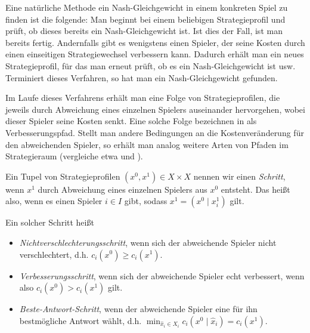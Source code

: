 Eine natürliche Methode ein Nash-Gleichgewicht in einem konkreten Spiel zu finden ist die folgende: Man beginnt bei einem beliebigen Strategieprofil und prüft, ob dieses bereits ein Nash-Gleichgewicht ist. Ist dies der Fall, ist man bereits fertig. Andernfalls gibt es wenigstens einen Spieler, der seine Kosten durch einen einseitigen Strategiewechsel verbessern kann. Dadurch erhält man ein neues Strategieprofil, für das man erneut prüft, ob es ein Nash-Gleichgewicht ist usw. Terminiert dieses Verfahren, so hat man ein Nash-Gleichgewicht gefunden. 

Im Laufe dieses Verfahrens erhält man eine Folge von Strategieprofilen, die jeweils durch Abweichung eines einzelnen Spielers auseinander hervorgehen, wobei dieser Spieler seine Kosten senkt. Eine solche Folge bezeichnen \citeauthor{MonShap} in \cite{MonShap} als \glqq Verbesserungspfad\grqq. Stellt man andere Bedingungen an die Kostenveränderung für den abweichenden Spieler, so erhält man analog weitere Arten von Pfaden im Strategieraum (vergleiche etwa \cite{CharExOrdPot} und \cite{BestRespPot}).

\begin{defn}\label{defn:Schritte}
	Ein Tupel von Strategieprofilen $(x^0, x^1) \in X\times X$ nennen wir einen \emph{Schritt}, wenn $x^1$ durch Abweichung eines einzelnen Spielers aus $x^0$ entsteht. Das heißt also, wenn es einen Spieler $i \in I$ gibt, sodass $x^1 = (x^0 \mid x^1_i)$ gilt. 
	
	Ein solcher Schritt heißt
	\begin{itemize}
		\item \emph{Nichtverschlechterungsschritt}, wenn sich der abweichende Spieler nicht verschlechtert, d.h. $c_i(x^0) \geq c_i(x^1)$.
		\item \emph{Verbesserungsschritt}, wenn sich der abweichende Spieler echt verbessert, wenn also $c_i(x^0) > c_i(x^1)$ gilt.
		\item \emph{Beste-Antwort-Schritt}, wenn der abweichende Spieler eine für ihn bestmögliche Antwort wählt, d.h. $\min_{\hat{x}_i \in X_i} c_i(x^0 \mid \hat{x}_i) = c_i(x^1)$.		
	\end{itemize}
\end{defn}

